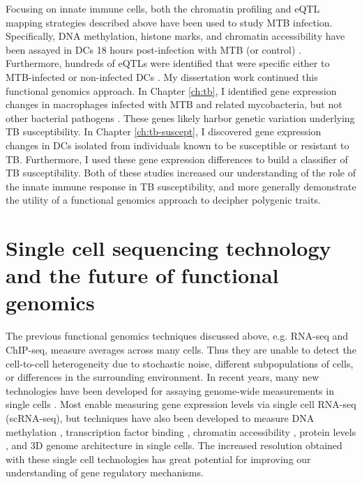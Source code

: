 Focusing on innate immune cells, both the chromatin profiling and eQTL
mapping strategies described above have been used to study MTB
infection. Specifically, DNA methylation, histone marks, and chromatin
accessibility have been assayed in DCs 18 hours post-infection with
MTB (or control) \citep{Pacis2015}. Furthermore, hundreds of eQTLs
were identified that were specific either to MTB-infected or
non-infected DCs \citep{Barreiro2012}. My dissertation work continued
this functional genomics approach. In Chapter \ref{ch:tb}, I
identified gene expression changes in macrophages infected with MTB
and related mycobacteria, but not other bacterial pathogens
\citep{Blischak2015}. These genes likely harbor genetic variation
underlying TB susceptibility. In Chapter \ref{ch:tb-suscept}, I
discovered gene expression changes in DCs isolated from individuals
known to be susceptible or resistant to TB. Furthermore, I used these
gene expression differences to build a classifier of TB
susceptibility. Both of these studies increased our understanding of
the role of the innate immune response in TB susceptibility, and more
generally demonstrate the utility of a functional genomics approach to
decipher polygenic traits.


\section{Single cell sequencing technology and the future of functional genomics}

The previous functional genomics techniques discussed above,
e.g. RNA-seq and ChIP-seq, measure averages across many cells. Thus
they are unable to detect the cell-to-cell heterogeneity due to
stochastic noise, different subpopulations of cells, or differences in
the surrounding environment. In recent years, many new technologies
have been developed for assaying genome-wide measurements in single
cells \citep{Liang2014, Macaulay2014, Saliba2014, Grun2015,
  Stegle2015, Bacher2016}.  Most enable measuring gene expression
levels via single cell RNA-seq (scRNA-seq), but techniques have also
been developed to measure DNA methylation \citep{Smallwood2014,
  Angermueller2016}, transcription factor binding \citep{Rotem2015},
chromatin accessibility \citep{Buenrostro2015, Cusanovich2015},
protein levels \citep{Genshaft2016}, and 3D genome architecture
\citep{Nagano2013} in single cells. The increased resolution obtained
with these single cell technologies has great potential for improving
our understanding of gene regulatory mechanisms.

